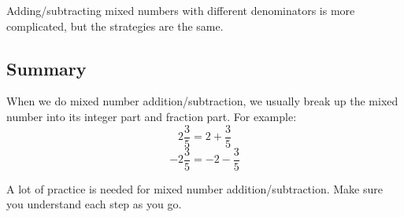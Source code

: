 Adding/subtracting mixed numbers with different denominators is more complicated, but the strategies are the same.

\subsection{Summary}
When we do mixed number addition/subtraction, we usually break up the mixed number into its integer part and fraction part. For example:
\[ 2\frac{3}{5} = 2+\frac{3}{5} \]
\[ -2\frac{3}{5} = -2-\frac{3}{5} \]

A lot of practice is needed for mixed number addition/subtraction. Make sure you understand each step as you go.

